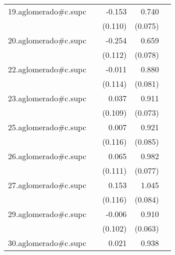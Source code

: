 {\begin{longtable}{l*{4}{D{.}{.}{-1}}}
\addlinespace
19.aglomerado#c.supc&                     &      -0.153         &       0.740\sym{***}&                     \\
            &                     &     (0.110)         &     (0.075)         &                     \\
\addlinespace
20.aglomerado#c.supc&                     &      -0.254\sym{*}  &       0.659\sym{***}&                     \\
            &                     &     (0.112)         &     (0.078)         &                     \\
\addlinespace
22.aglomerado#c.supc&                     &      -0.011         &       0.880\sym{***}&                     \\
            &                     &     (0.114)         &     (0.081)         &                     \\
\addlinespace
23.aglomerado#c.supc&                     &       0.037         &       0.911\sym{***}&                     \\
            &                     &     (0.109)         &     (0.073)         &                     \\
\addlinespace
25.aglomerado#c.supc&                     &       0.007         &       0.921\sym{***}&                     \\
            &                     &     (0.116)         &     (0.085)         &                     \\
\addlinespace
26.aglomerado#c.supc&                     &       0.065         &       0.982\sym{***}&                     \\
            &                     &     (0.111)         &     (0.077)         &                     \\
\addlinespace
27.aglomerado#c.supc&                     &       0.153         &       1.045\sym{***}&                     \\
            &                     &     (0.116)         &     (0.084)         &                     \\
\addlinespace
29.aglomerado#c.supc&                     &      -0.006         &       0.910\sym{***}&                     \\
            &                     &     (0.102)         &     (0.063)         &                     \\
\addlinespace
30.aglomerado#c.supc&                     &       0.021         &       0.938\sym{***}&                     \\

\end{longtable}}
